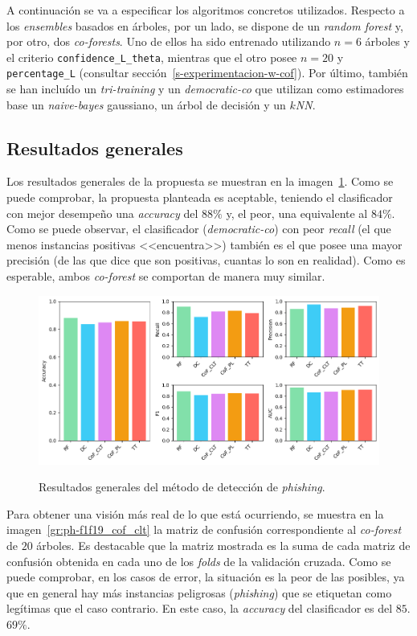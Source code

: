 A continuación se va a especificar los algoritmos concretos utilizados. Respecto a los \textit{ensembles} basados en árboles, por un lado, se dispone de un \textit{random forest} y, por otro, dos \textit{co-forests}. Uno de ellos ha sido entrenado utilizando $n = 6$ árboles y el criterio \texttt{confidence\_L\_theta}, mientras que el otro posee $n = 20$ y \texttt{percentage\_L} (consultar sección~\ref{s-experimentacion-w-cof}). Por último, también se han incluído un \textit{tri-training} y un \textit{democratic-co} que utilizan como estimadores base un \textit{naive-bayes} gaussiano, un árbol de decisión y un \textit{$k$NN}.


\subsection{Resultados generales}

Los resultados generales de la propuesta se muestran en la imagen~\ref{gr:ph-f1f19-all}. Como se puede comprobar, la propuesta planteada es aceptable, teniendo el clasificador con mejor desempeño una \textit{accuracy} del $88\%$ y, el peor, una equivalente al $84\%$. Como se puede observar, el clasificador (\textit{democratic-co}) con peor \textit{recall} (el que menos instancias positivas <<encuentra>>) también es el que posee una mayor precisión (de las que dice que son positivas, cuantas lo son en realidad). Como es esperable, ambos \textit{co-forest} se comportan de manera muy similar.

\begin{figure}[h]
	\caption[\textit{Phishing}: detección (\texttt{f1-f19})]{Resultados generales del método de detección de \textit{phishing}.}
	\centering
	\includegraphics[width=\textwidth]{../img/memoria/5_phishing/f1f19_all_big}
	\label{gr:ph-f1f19-all}
\end{figure}

Para obtener una visión más real de lo que está ocurriendo, se muestra en la imagen~\ref{gr:ph-f1f19_cof_clt} la matriz de confusión correspondiente al \textit{co-forest} de $20$ árboles. Es destacable que la matriz mostrada es la suma de cada matriz de confusión obtenida en cada uno de los \textit{folds} de la validación cruzada. Como se puede comprobar, en los casos de error, la situación es la peor de las posibles, ya que en general hay más instancias peligrosas (\textit{phishing}) que se etiquetan como legítimas que el caso contrario. En este caso, la \textit{accuracy} del clasificador es del $85$.$69\%$.


